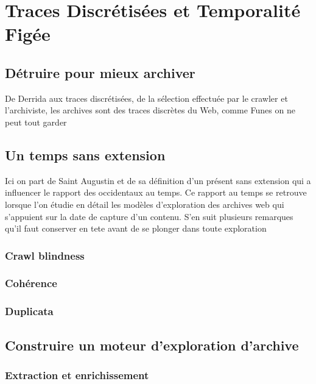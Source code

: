\documentclass{tufte-book}
\begin{document}

\chapter{Traces Discrétisées et Temporalité Figée}

\section{Détruire pour mieux archiver}

De Derrida aux traces discrétisées, de la sélection effectuée par le crawler et l'archiviste, les archives sont des traces discrètes du Web, comme Funes on ne peut tout garder 

\section{Un temps sans extension}

Ici on part de Saint Augustin et de sa définition d'un présent sans extension qui a influencer le rapport des occidentaux au temps. Ce rapport au temps se retrouve lorsque l'on étudie en détail les modèles d'exploration des archives web qui s'appuient sur la date de capture d'un contenu. S'en suit plusieurs remarques qu'il faut conserver en tete avant de se plonger dans toute exploration

\subsection{Crawl blindness}

\subsection{Cohérence}

\subsection{Duplicata}

\section{Construire un moteur d'exploration d'archive}

\subsection{Extraction et enrichissement}
\end{document}
